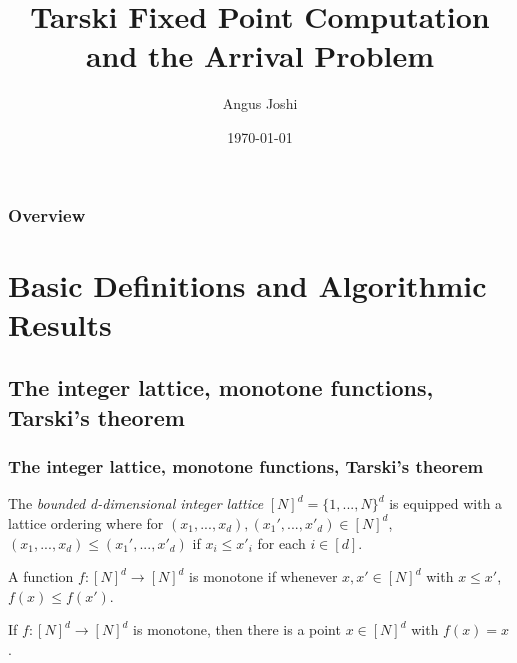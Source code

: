 \documentclass{beamer}
\title[Tarski]{Tarski Fixed Point Computation and the Arrival Problem} %
\author{Angus Joshi} %
\institute[UoE] %
{
University of Edinburgh \\ %
\medskip
\textit{s1712180@ed.ac.uk} %
}
\date{\today} %
\begin{document}
\begin{frame}
\titlepage %
\end{frame}

\begin{frame}
\frametitle{Overview} %
\tableofcontents %
\end{frame}


\section{Basic Definitions and Algorithmic Results} %

\subsection{The integer lattice, monotone functions, Tarski's theorem} %

\begin{frame}
\frametitle{The integer lattice, monotone functions, Tarski's theorem}
    \begin{definition}
        The \emph{bounded d-dimensional integer lattice} $[N]^d = \{1, ..., N\}^d$ is equipped with a lattice ordering
        where for $(x_1, ..., x_d), (x_1', ..., x'_d) \in [N]^d$, $(x_1, ..., x_d) \leq (x_1', ..., x'_d)$ if
        $x_i \leq x'_i$ for each $i \in [d]$.
    \end{definition}
    \begin{definition} 
        A function $f : [N]^d \to [N]^d$ is monotone if whenever $x, x' \in [N]^d$ with $x \leq x'$, $f(x) \leq f(x')$.
    \end{definition}
    \begin{Theorem}[Tarski]
        If $f : [N]^d \to [N]^d$ is monotone, then there is a point $x \in [N]^d$ with $f(x) = x$.
    \end{Theorem}
\end{frame}
\end{document}
